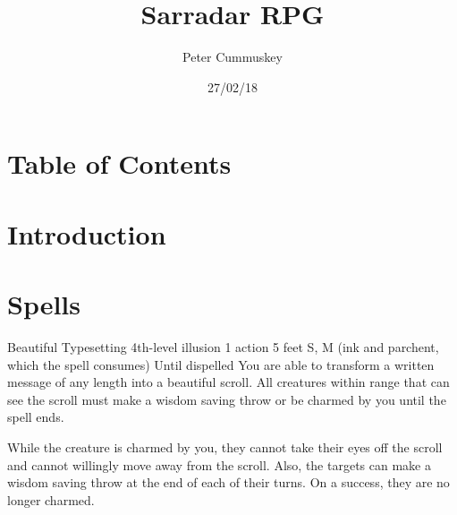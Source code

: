 \documentclass[10pt,twoside,openany]{book}
\title{Sarradar RPG}
\author{Peter Cummuskey}
\date{27/02/18}
\begin{document}
\maketitle

\chapter{Table of Contents}
\makeatletter
	\let\ps@plain\ps@fancy
\makeatother

\chapter{Introduction}
\begin{multicols}{2}


\end{multicols}

\chapter{Spells}
\begin{multicols}{2}

		\begin{spell}
			{Beautiful Typesetting}
			{4th-level illusion}
			{1 action}
			{5 feet}
			{S, M (ink and parchent, which the spell consumes)}
			{Until dispelled}
			You are able to transform a written message of any length into a beautiful scroll. All creatures within range that can see the scroll must make a wisdom saving throw or be charmed by you until the spell ends.

	While the creature is charmed by you, they cannot take their eyes off the scroll and cannot willingly move away from the scroll. Also, the targets can make a wisdom saving throw at the end of each of their turns. On a success, they are no longer charmed.
		\end{spell}

\end{multicols}
\end{document}
